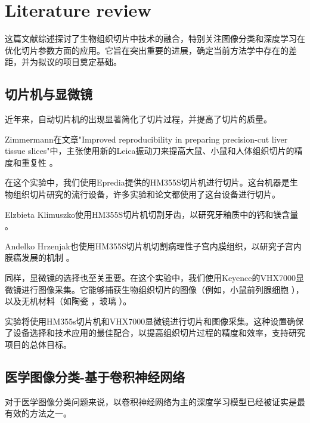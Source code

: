 \section{Literature review}


这篇文献综述探讨了生物组织切片中技术的融合，特别关注图像分类和深度学习在优化切片参数方面的应用。它旨在突出重要的进展，确定当前方法学中存在的差距，并为拟议的项目奠定基础。

\subsection{切片机与显微镜}

近年来，自动切片机的出现显著简化了切片过程，并提高了切片的质量。

Zimmermann在文章"Improved reproducibility in preparing precision-cut liver tissue slices"中，主张使用新的Leica振动刀来提高大鼠、小鼠和人体组织切片的精度和重复性 \cite{LR.1}。

在这个实验中，我们使用Epredia提供的HM355S切片机进行切片。这台机器是生物组织切片研究的流行设备，许多实验和论文都使用了这台设备进行切片。

Elzbieta Klimuszko使用HM355S切片机切割牙齿，以研究牙釉质中的钙和镁含量 \cite{LR.2}。

Andelko Hrzenjak也使用HM355S切片机切割病理性子宫内膜组织，以研究子宫内膜癌发展的机制 \cite{LR.3}。

同样，显微镜的选择也至关重要。在这个实验中，我们使用Keyence的VHX7000显微镜进行图像采集。它能够捕获生物组织切片的图像（例如，小鼠前列腺细胞 \cite{LR.4}），以及无机材料（如陶瓷 \cite{LR.5}，玻璃 \cite{LR.6}）。

实验将使用HM355s切片机和VHX7000显微镜进行切片和图像采集。这种设置确保了设备选择和技术应用的最佳配合，以提高组织切片过程的精度和效率，支持研究项目的总体目标。








\subsection{医学图像分类-基于卷积神经网络}

对于医学图像分类问题来说，以卷积神经网络为主的深度学习模型已经被证实是最有效的方法之一。\cite{5.1 1}


